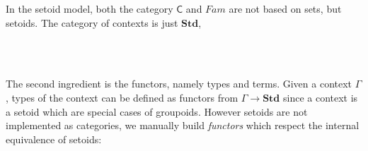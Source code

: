 In the setoid model, both the category $\mathsf{C}$ and $Fam$ are not based on sets, but setoids.
The category of contexts is just $\textbf{Std}$,

\begin{code}
%
\\
\> \AgdaSymbol{=} \<%
\\
\end{code}

The second ingredient is the functors, namely types and terms.
Given a context $\Gamma$, types of the context can be defined as functors from $\Gamma \to \textbf{Std}$ since a context is a setoid which are special cases of groupoids. However setoids are not implemented as categories, we manually build \emph{functors} which respect the internal equivalence of setoids:

